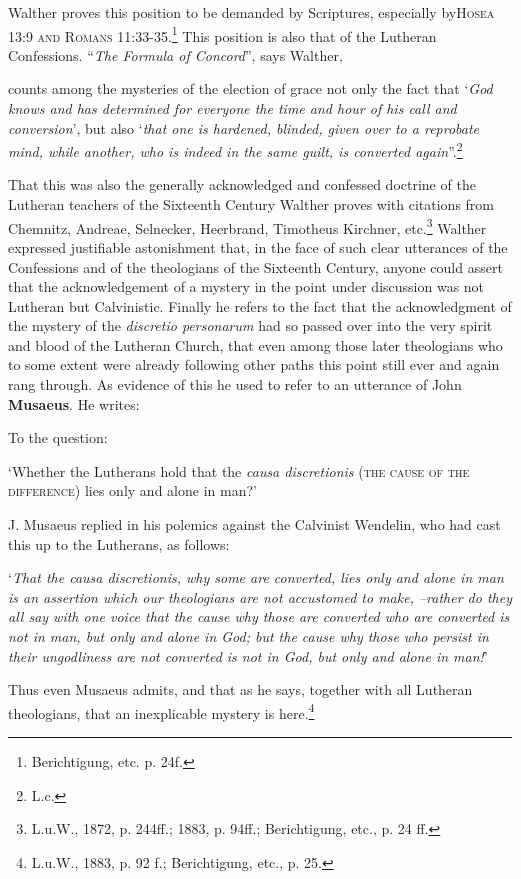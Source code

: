                 Walther proves this position to be demanded by Scriptures, especially by{\scriptsize\textsc{Hosea 13:9 and Romans 11:33-35}}.\footnote{Berichtigung, etc. p. 24f.}  This position is also that of the Lutheran Confessions.  “\textit{The Formula of Concord}”, says Walther, \begin{fancyquotes}counts among the mysteries of the election of grace not only the fact  that ‘\textit{God knows and has determined for everyone the time and hour of his call and conversion}’, but also ‘\textit{that one is hardened, blinded, given over to a reprobate mind, while another, who is indeed in the same guilt, is converted again}”.\footnote{L.c.}\end{fancyquotes}  That this was also the generally acknowledged and confessed doctrine of the Lutheran teachers of the Sixteenth Century Walther proves with citations from Chemnitz, Andreae, Selnecker, Heerbrand, Timotheus Kirchner, etc.\footnote{L.u.W., 1872, p. 244ff.; 1883, p. 94ff.; Berichtigung, etc., p. 24 ff.}  Walther expressed justifiable astonishment that, in the face of such clear utterances of the Confessions and of the theologians of the Sixteenth Century, anyone could assert that the acknowledgement of a mystery in the point under discussion was not Lutheran but Calvinistic.  Finally he refers to the fact that the acknowledgment of the mystery of the \textit{discretio personarum} had so passed over into the very spirit and blood of the Lutheran Church, that even among those later theologians who to some extent were already following other paths this point still ever and again rang through.  As evidence of this he used to refer to an utterance of John \textbf{Musaeus}.  He writes: \begin{fancyquotes}To the question: \begin{displayquote}‘Whether the Lutherans hold that the \textit{causa discretionis} {\scriptsize\textsc{(the cause of the difference)}} lies only and alone in man?’ \end{displayquote} J. Musaeus replied in his polemics against the Calvinist Wendelin, who had cast this up to the Lutherans, as follows: \begin{displayquote}‘\textit{That the causa discretionis, why some are converted, lies only and alone in man is an assertion which our theologians are not accustomed to make,  --rather do they all say with one voice that the cause why those are converted who are converted is not in man, but only and alone in God; but the cause why those who persist in their ungodliness are not converted is not in God, but only and alone in man!}'\end{displayquote}  Thus even Musaeus admits, and that as he says, together with all Lutheran theologians, that an inexplicable mystery is here.\footnote{L.u.W., 1883, p. 92 f.; Berichtigung, etc., p. 25.}\end{fancyquotes}

